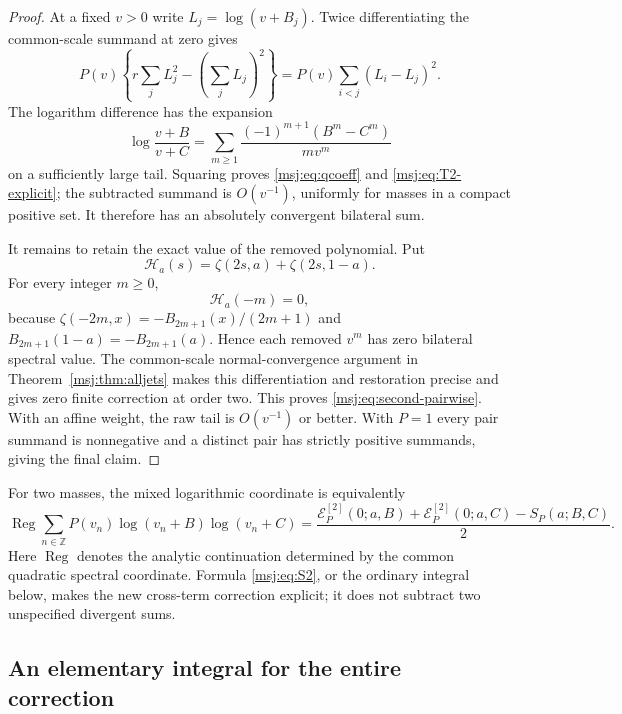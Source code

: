 \documentclass[11pt,a4paper]{article}
\numberwithin{equation}{section}
\theoremstyle{plain}
\theoremstyle{definition}
\theoremstyle{remark}
\begin{document}
\begin{proof}
At a fixed $v>0$ write $L_j=\log(v+B_j)$. Twice differentiating the
common-scale summand at zero gives
\[
 P(v)\left\{r\sum_jL_j^2-\left(\sum_jL_j\right)^2\right\}
        =P(v)\sum_{i<j}(L_i-L_j)^2.
\]
The logarithm difference has the expansion
\[
 \log\frac{v+B}{v+C}
   =\sum_{m\ge1}\frac{(-1)^{m+1}(B^m-C^m)}{m v^m}
\]
on a sufficiently large tail. Squaring proves
\eqref{msj:eq:qcoeff} and \eqref{msj:eq:T2-explicit}; the subtracted
summand is $O(v^{-1})$, uniformly for masses in a compact positive set.
It therefore has an absolutely convergent bilateral sum.

It remains to retain the exact value of the removed polynomial. Put
\begin{equation}
 \mathcal H_a(s)=\zeta(2s,a)+\zeta(2s,1-a).
 \label{msj:eq:H}
\end{equation}
For every integer $m\ge0$,
\begin{equation}
 \mathcal H_a(-m)=0,
 \label{msj:eq:trivial-zero}
\end{equation}
because $\zeta(-2m,x)=-B_{2m+1}(x)/(2m+1)$ and
$B_{2m+1}(1-a)=-B_{2m+1}(a)$. Hence each removed $v^m$ has zero
bilateral spectral value. The common-scale normal-convergence argument
in Theorem~\ref{msj:thm:alljets} makes this differentiation and restoration
precise and gives zero finite correction at order two. This proves
\eqref{msj:eq:second-pairwise}. With an affine weight, the raw tail is
$O(v^{-1})$ or better. With $P=1$ every pair summand is nonnegative and
a distinct pair has strictly positive summands, giving the final claim.
\end{proof}

For two masses, the mixed logarithmic coordinate is equivalently
\begin{equation}
 \operatorname{Reg}\sum_{n\in\mathbb Z}
  P(v_n)\log(v_n+B)\log(v_n+C)
 =\frac{\mathcal E_P^{[2]}(0;a,B)+\mathcal E_P^{[2]}(0;a,C)
                     -S_P(a;B,C)}2.
 \label{msj:eq:cross-term}
\end{equation}
Here $\operatorname{Reg}$ denotes the analytic continuation determined
by the common quadratic spectral coordinate. Formula
\eqref{msj:eq:S2}, or the ordinary integral below, makes the new
cross-term correction explicit; it does not subtract two unspecified
divergent sums.

\subsection{An elementary integral for the entire correction}
\end{document}
